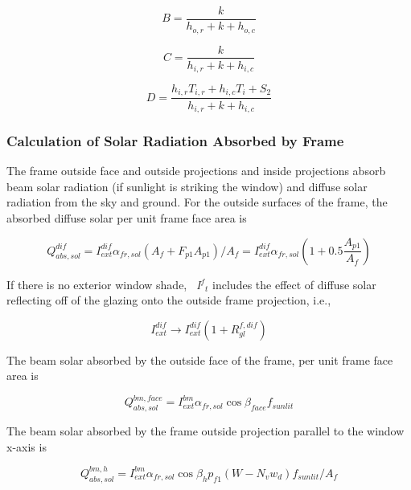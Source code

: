 \begin{equation}
B = \frac{k}{{{h_{o,r}} + k + {h_{o,c}}}}
\end{equation}

\begin{equation}
C = \frac{k}{{{h_{i,r}} + k + {h_{i,c}}}}
\end{equation}

\begin{equation}
D = \frac{{{h_{i,r}}{T_{i,r}} + {h_{i,c}}{T_i} + {S_2}}}{{{h_{i,r}} + k + {h_{i,c}}}}
\end{equation}

\subsubsection{Calculation of Solar Radiation Absorbed by Frame}\label{calculation-of-solar-radiation-absorbed-by-frame}

The frame outside face and outside projections and inside projections absorb beam solar radiation (if sunlight is striking the window) and diffuse solar radiation from the sky and ground. For the outside surfaces of the frame, the absorbed diffuse solar per unit frame face area is

\begin{equation}
Q_{abs,sol}^{dif} = I_{ext}^{dif}{\alpha_{fr,sol}}\left( {{A_f} + {F_{p1}}{A_{p1}}} \right)/{A_f} = I_{ext}^{dif}{\alpha_{fr,sol}}\left( {1 + 0.5\frac{{{A_{p1}}}}{{{A_f}}}} \right)
\end{equation}

If there is no exterior window shade, \emph{~I\(^{f}\)\(_{t}\)} includes the effect of diffuse solar reflecting off of the glazing onto the outside frame projection, i.e.,

\begin{equation}
I_{ext}^{dif} \to I_{ext}^{dif}\left( {1 + R_{gl}^{f,dif}} \right)
\end{equation}

The beam solar absorbed by the outside face of the frame, per unit frame face area is

\begin{equation}
Q_{abs,sol}^{bm,face} = I_{ext}^{bm}{\alpha_{fr,sol}}\cos {\beta_{face}}{f_{sunlit}}
\end{equation}

The beam solar absorbed by the frame outside projection parallel to the window x-axis is

\begin{equation}
Q_{abs,sol}^{bm,h} = I_{ext}^{bm}{\alpha_{fr,sol}}\cos {\beta_h}{p_{f1}}\left( {W - {N_v}{w_d}} \right){f_{sunlit}}/{A_f}
\end{equation}

